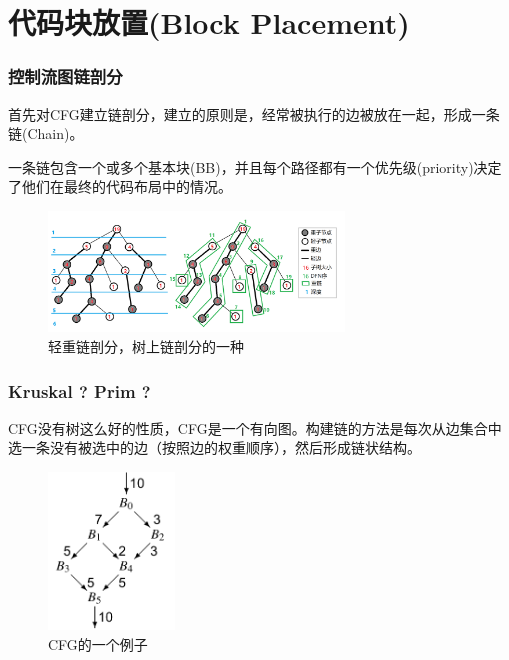 \section{代码块放置(Block Placement)}

\begin{frame}
    \frametitle{控制流图链剖分}

    首先对CFG建立链剖分，建立的原则是，经常被执行的边被放在一起，形成一条链(Chain)。

    一条链包含一个或多个基本块(BB)，并且每个路径都有一个优先级(priority)决定了他们在最终的代码布局中的情况。

    \begin{figure}
        \centering
        \includegraphics[width=0.7\textwidth]{images/hld.png}
        \caption{\cite{unknown-author-2022}轻重链剖分，树上链剖分的一种}
    \end{figure}

\end{frame}


\begin{frame}[fragile]
    \frametitle{Kruskal ? Prim ?}

    CFG没有树这么好的性质，CFG是一个有向图。构建链的方法是每次从边集合中选一条没有被选中的边（按照边的权重顺序），然后形成链状结构。

    \begin{figure}
        \centering
        \includegraphics[width=0.3\textwidth]{images/example_cfg.png}
        \caption{CFG的一个例子\cite{cooper2011engineering}}
    \end{figure}



\end{frame}

